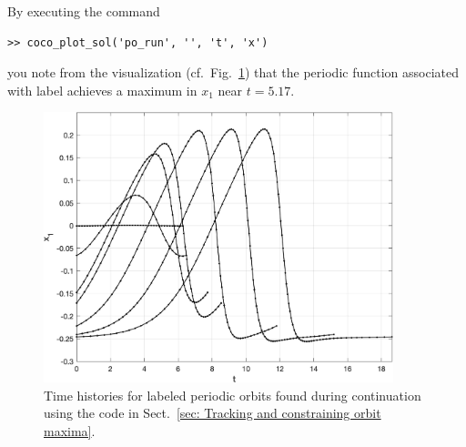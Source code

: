 By executing the command
\begin{lstlisting}[language=coco-highlight,frame=lines]
>> coco_plot_sol('po_run', '', 't', 'x')
\end{lstlisting}
you note from the visualization (cf.\ Fig.~\ref{fig: Section7_4_1}) that the periodic function associated with label  achieves a maximum in $x_1$ near $t=5.17$. 
\begin{figure}[h]
\centering
\includegraphics[width=4in]{Figures/Section7_4_1.jpg}
\caption{Time histories for labeled periodic orbits found during continuation using the code in Sect.~\ref{sec: Tracking and constraining orbit maxima}.}
\label{fig: Section7_4_1}
\end{figure}

